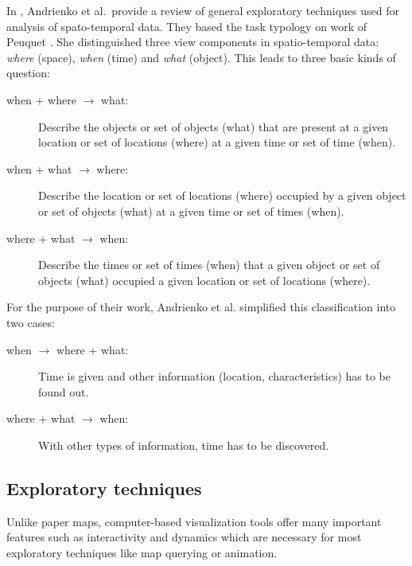 \documentclass[a4paper,12pt]{book}
\begin{document}
In \cite{andrienko2003exploratory}, Andrienko et al.\ provide a review
of general exploratory techniques used for analysis of spato-temporal data.
They based the task typology on work
of Peuquet \cite{peuquet1994s}.
She distinguished three view components in spatio-temporal data:
\emph{where} (space), \emph{when} (time) and \emph{what} (object).
This leads to three basic kinds of question:
\begin{description}
    \item[when + where $\rightarrow$ what:]
        Describe the objects or set of objects (what) that are present
        at a given location or set of locations (where)
        at a given time or set of time (when).

    \item [when + what $\rightarrow$ where:]
        Describe the location or set of locations (where) occupied
        by a given object or set of objects (what) at
        a given time or set of times (when).

    \item [where + what $\rightarrow$ when:]
        Describe the times or set of times (when) that a given
        object or set of objects (what) occupied a
        given location or set of locations (where).
 \end{description}

For the purpose of their work, Andrienko et al. simplified this classification into two cases:
    \begin{description}
        \item[when $\rightarrow$ where + what:]
            Time is given and other information (location, characteristics) has to be found out.
        \item[where + what $\rightarrow$ when:]
            With other types of information, time has to be discovered.

     \end{description}
 

\subsection{Exploratory techniques}
Unlike paper maps, computer-based visualization tools offer many important features
such as interactivity and dynamics which are necessary for most exploratory techniques
like map querying or animation.
\end{document}

